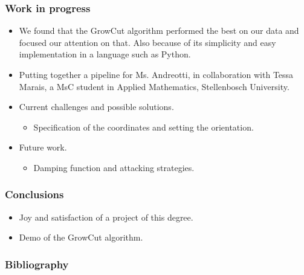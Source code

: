 \documentclass{beamer}
\newcommand{\myitem}{\item[$-$]}
\begin{document}
\begin{frame}
\frametitle{Work in progress} 
\begin{itemize}
\item We found that the GrowCut algorithm performed the best on our data and
focused our attention on that.  Also because of its simplicity and easy
implementation in a language such as Python.
\item Putting together a pipeline for Ms. Andreotti, in collaboration with Tessa
Marais, a MsC student in Applied Mathematics, Stellenbosch University.
\item Current challenges and possible solutions.
\begin{itemize}
\myitem Specification of the coordinates and setting the orientation.
\end{itemize}
\item Future work.
\begin{itemize}
\myitem Damping function and attacking strategies.
\end{itemize}
\end{itemize}
\end{frame}


\begin{frame}
\frametitle{Conclusions}
\begin{itemize}
\item Joy and satisfaction of a project of this degree.
\item Demo of the GrowCut algorithm.
\end{itemize}
\end{frame}


\begin{frame}
\frametitle{Bibliography}


\end{frame}
\end{document}
